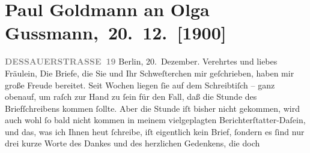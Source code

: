 

         
         \renewcommand{\erwaehntePersonen}{Personen:  Aristophanes, Paul Goldmann, Friedrich Hebbel, Alfred Klaar, Paul Marx, Olga Schnitzler, Elisabeth Steinrück, Leo N. von Tolstoi, Adolf von Wilbrandt}
         \renewcommand{\erwaehnteInstitutionen}{Institutionen: Berliner Theater, Bohemia, Deutsches Theater Berlin, Schauspielhaus Berlin, Vossische Zeitung}
         \renewcommand{\erwaehnteOrte}{Orte: Berlin, Café Josty, Dessauer Straße, Rotensterngasse, Wien}
         \renewcommand{\erwaehnteWerke}{Werke: Agnes Bernauer, Die Macht der Finsternis, Frauenherrschaft. Lustspiel in vier Aufzügen nach Aristophanes’ »Ekklesiazusen« und »Lysistrate«}
               \section[ Paul Goldmann an Olga Gussmann, 20. 12. {[}1900{]}]{ Paul Goldmann an Olga Gussmann, 20. 12. {[}1900{]}}\nopagebreak{}\rehead{ }\begin{ledgroupsized}[t]{13cm}\normalsize\beginnumbering{} \toendnotes[C]{\smallbreak\pagebreak[2]} 
\toendnotes[C]{\smallbreak}\pstart
           \noindent{}\raggedleft{}{\pb}\textcolor{gray}{\textbf{DESSAUERSTRASSE 19}}\pend
           \pstart
           Berlin, 20. Dezember.\pend
           \pstart\center{}Verehrtes und liebes Fräulein,\pend\pstart
           Die Briefe, die Sie und Ihr Schweſterchen mir geſchrieben, haben mir  große Freude bereitet. Seit Wochen liegen ſie auf dem Schreibtiſch – ganz
               obenauf, um raſch zur Hand zu ſein für den Fall, daß die Stunde des Briefſchreibens
               kommen ſollte. Aber die Stunde iſt bisher nicht gekommen, wird auch wohl ſo bald
               nicht kommen in meinem vielgeplagten Berichterſtatter-Daſein, und das, was ich Ihnen
                  heut ſchreibe, iſt eigentlich kein Brief, ſondern
               es ſind nur drei kurze Worte des Dankes und des herzlichen Gedenkens, die doch

\end{ledgroupsized}
